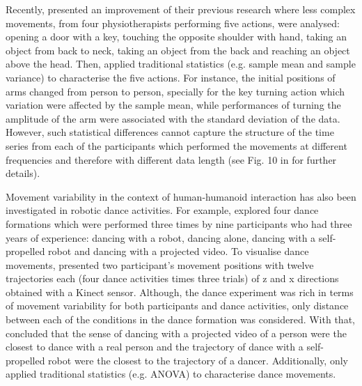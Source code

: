 Recently, \cite{guneysu2015} presented an improvement of their previous research
where less complex movements, from four physiotherapists performing five 
actions, were analysed: opening a door with a key, 
touching the opposite shoulder with hand, taking an object from back to neck, 
taking an object from the back and reaching an object above the head.
Then, \cite{guneysu2015} applied traditional statistics 
(e.g. sample mean and sample variance) to characterise the five actions.
For instance, the  initial positions of arms changed from person to person, 
specially for the key turning action which variation were affected by the 
sample mean, while performances of turning the amplitude of the arm
were associated with the standard deviation of the data.
However, such statistical differences cannot capture the structure of the 
time series from each of the participants which performed the movements
at different frequencies and therefore with different data length
(see Fig. 10 in \cite{guneysu2015} for further details).


Movement variability in the context of human-humanoid interaction has also been
investigated in robotic dance activities.
For example, \cite{tsuchida2013} explored four dance formations which were 
performed three times by nine participants who had three years of experience: 
dancing with a robot, dancing alone, dancing with a self-propelled robot and 
dancing with a projected video.
To visualise dance movements, \cite{tsuchida2013} presented two participant's 
movement positions with twelve trajectories each (four dance activities times 
three trials) of z and x directions obtained with a Kinect sensor.
Although, the dance experiment was rich in terms of movement variability
for both participants and dance activities, only distance between each of 
the conditions in the dance formation was considered. 
With that, \cite{tsuchida2013} concluded that the sense of dancing with a 
projected video of a person were the closest to dance with a real person and 
the trajectory of dance with a self-propelled robot were the closest 
to the trajectory of a dancer. Additionally, \cite{tsuchida2013} only applied 
traditional statistics (e.g. ANOVA) to characterise dance movements.






